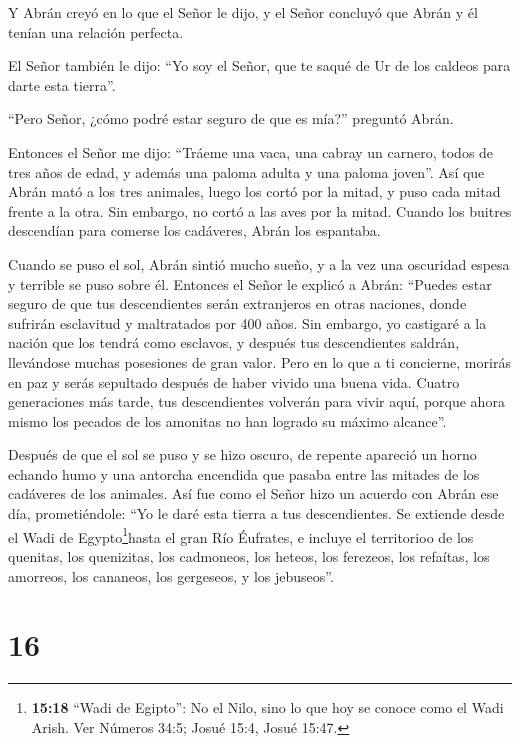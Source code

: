  Y Abrán creyó en lo que el Señor le dijo, y el Señor
concluyó que Abrán y él tenían una relación perfecta.

 El Señor también le dijo: ``Yo soy el Señor, que te saqué
de Ur de los caldeos para darte esta tierra''.

 ``Pero Señor, ¿cómo podré estar seguro de que es mía?''
preguntó Abrán.

 Entonces el Señor me dijo: ``Tráeme una vaca, una cabray un
carnero, todos de tres años de edad, y además una paloma adulta y una
paloma joven''.  Así que Abrán mató a los tres animales,
luego los cortó por la mitad, y puso cada mitad frente a la otra. Sin
embargo, no cortó a las aves por la mitad.  Cuando los
buitres descendían para comerse los cadáveres, Abrán los espantaba.

 Cuando se puso el sol, Abrán sintió mucho sueño, y a la
vez una oscuridad espesa y terrible se puso sobre él. 
Entonces el Señor le explicó a Abrán: ``Puedes estar seguro de que tus
descendientes serán extranjeros en otras naciones, donde sufrirán
esclavitud y maltratados por 400 años.  Sin embargo, yo
castigaré a la nación que los tendrá como esclavos, y después tus
descendientes saldrán, llevándose muchas posesiones de gran valor.
 Pero en lo que a ti concierne, morirás en paz y serás
sepultado después de haber vivido una buena vida.  Cuatro
generaciones más tarde, tus descendientes volverán para vivir aquí,
porque ahora mismo los pecados de los amonitas no han logrado su máximo
alcance''.

 Después de que el sol se puso y se hizo oscuro, de repente
apareció un horno echando humo y una antorcha encendida que pasaba entre
las mitades de los cadáveres de los animales.  Así fue como
el Señor hizo un acuerdo con Abrán ese día, prometiéndole: ``Yo le daré
esta tierra a tus descendientes. Se extiende desde el Wadi de
Egypto\footnote{\textbf{15:18} ``Wadi de Egipto'': No el Nilo, sino lo
  que hoy se conoce como el Wadi Arish. Ver Números 34:5; Josué 15:4,
  Josué 15:47.}hasta el gran Río Éufrates,  e incluye el
territorioo de los quenitas, los quenizitas, los cadmoneos,
 los heteos, los ferezeos, los refaítas,  los
amorreos, los cananeos, los gergeseos, y los jebuseos''.

\hypertarget{section-15}{%
\section{16}\label{section-15}}

